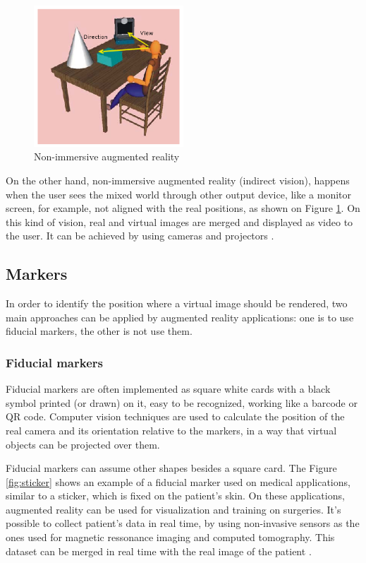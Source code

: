 \documentclass[msc, a4paper, classic, en]{ufbathesis}
\begin{document}
\begin{figure}
\label{fig:indirect}
\centering
\includegraphics[width=0.5\textwidth]{images/indirect.png}
\caption{Non-immersive augmented reality}
\end{figure}

On the other hand, non-immersive augmented reality (indirect vision), happens when the user sees the mixed world through other output device, like a monitor screen, for example, not aligned with the real positions, as shown on Figure \ref{fig:indirect}. On this kind of vision, real and virtual images are merged and displayed as video to the user. It can be achieved by using cameras and projectors \cite{1}.

\subsection{Markers}

In order to identify the position where a virtual image should be rendered, two main approaches can be applied by augmented reality applications: one is to use fiducial markers, the other is not use them.

\subsubsection{Fiducial markers}

Fiducial markers are often implemented as square white cards with a black symbol printed (or drawn) on it, easy to be recognized, working like a barcode or QR code. Computer vision techniques are used to calculate the position of the real camera and its orientation relative to the markers, in a way that virtual objects can be projected over them.

Fiducial markers can assume other shapes besides a square card. The Figure \ref{fig:sticker} shows an example of a fiducial marker used on medical applications, similar to a sticker, which is fixed on the patient's skin. On these applications, augmented reality can be used for visualization and training on surgeries. It's possible to collect patient's data in real time, by using non-invasive sensors as the ones used for magnetic ressonance imaging and computed tomography. This dataset can be merged in real time with the real image of the patient \cite{12}.
\end{document}
